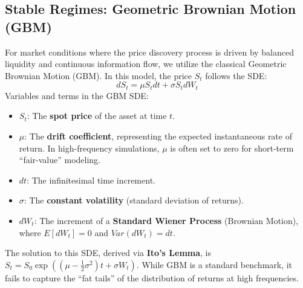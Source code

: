 \subsection{Stable Regimes: Geometric Brownian Motion (GBM)}
For market conditions where the price discovery process is driven by balanced liquidity and continuous information flow, we utilize the classical Geometric Brownian Motion (GBM). In this model, the price $S_t$ follows the SDE:
\begin{equation}
    dS_t = \mu S_t dt + \sigma S_t dW_t
\end{equation}
Variables and terms in the GBM SDE:
\begin{itemize}
    \item $S_t$: The \textbf{spot price} of the asset at time $t$.
    \item $\mu$: The \textbf{drift coefficient}, representing the expected instantaneous rate of return. In high-frequency simulations, $\mu$ is often set to zero for short-term ``fair-value'' modeling.
    \item $dt$: The infinitesimal time increment.
    \item $\sigma$: The \textbf{constant volatility} (standard deviation of returns).
    \item $dW_t$: The increment of a \textbf{Standard Wiener Process} (Brownian Motion), where $E[dW_t] = 0$ and $Var(dW_t) = dt$.
\end{itemize}
The solution to this SDE, derived via \textbf{Ito's Lemma}, is $S_t = S_0 \exp\left((\mu - \frac{1}{2}\sigma^2)t + \sigma W_t\right)$. While GBM is a standard benchmark, it fails to capture the ``fat tails'' of the distribution of returns at high frequencies.

